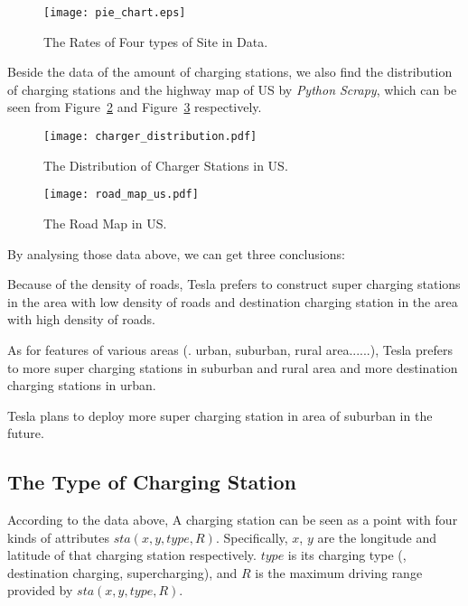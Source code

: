 \begin{figure}[!t]
\centering
\texttt{[image: pie\_chart.eps]}
\caption{The Rates of Four types of Site in Data.}
\label{fig_composition_rate}
\end{figure}

Beside the data of the amount of charging stations,
we also find the distribution of  charging stations and the highway map of US by \emph{Python Scrapy},
which can be seen from Figure~\ref{fig_charger_distribution} and Figure~\ref{fig_road_map} respectively.

\begin{figure}[!t]
\centering
\texttt{[image: charger\_distribution.pdf]}
\caption{The Distribution of Charger Stations in US.}
\label{fig_charger_distribution}
\end{figure}

\begin{figure}[!t]
\centering
\texttt{[image: road\_map\_us.pdf]}
\caption{The Road Map in US.}
\label{fig_road_map}
\end{figure}

By analysing those data above, we can get three conclusions:
\begin{conclusion}
\label{conclusion_1}
Because of the density of roads, Tesla prefers to construct super charging stations in the area with low density of roads and destination charging station in the area with high density of roads.
\end{conclusion}
\begin{conclusion}
\label{conclusion_2}
As for features of various areas (\eg. urban, suburban, rural area......), Tesla prefers to more super charging stations in suburban and rural area and more destination charging stations in urban.
\end{conclusion}
\begin{conclusion}
\label{conclusion_3}
Tesla plans to deploy more super charging station in area of suburban in the future.
\end{conclusion}

\subsection{The Type of Charging Station}
According to the data above,
A charging station can be seen as a point with four kinds of attributes $sta(x, y, type, R)$.
Specifically, $x$, $y$ are the longitude and latitude of that charging station respectively.
$type$ is its charging type (\eg, destination charging, supercharging),
and $R$ is the maximum driving range provided by $sta(x, y, type, R)$.

